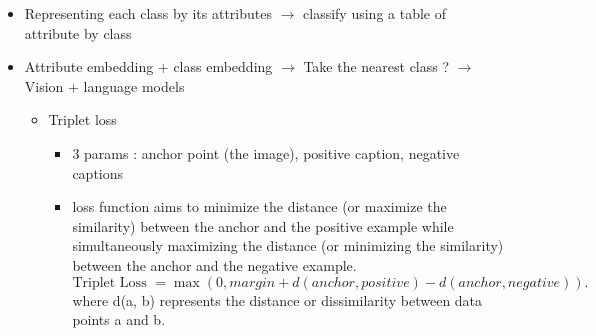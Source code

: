\documentclass{article}
\theoremstyle{plain}%
\theoremstyle{definition}
\theoremstyle{remark}
\begin{document}
\begin{itemize}
    \item Representing each class by its attributes $\rightarrow$ classify using a table of attribute by class
    \item Attribute embedding + class embedding $\rightarrow$ Take the nearest class ? $\rightarrow$ Vision + language models \begin{itemize}
        \item Triplet loss \begin{itemize}
            \item 3 params : anchor point (the image), positive caption, negative captions
            \item loss function aims to minimize the distance (or maximize the similarity) between the anchor and the positive example while simultaneously maximizing the distance (or minimizing the similarity) between the anchor and the negative example.
            \[
                \text{Triplet Loss }= \max(0, margin + d(anchor, positive) - d(anchor, negative))
            .\]
            where d(a, b) represents the distance or dissimilarity between data points a and b.
        \end{itemize}
    \end{itemize}
\end{itemize}
\end{document}

